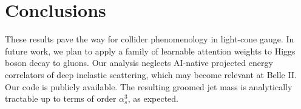 \section{Conclusions}\label{sec:conclusions}

These results pave the way for collider phenomenology in light-cone
gauge. In future work, we plan to apply a family of learnable attention
weights to Higgs boson decay to gluons. Our analysis neglects AI-native
projected energy correlators of deep inelastic scattering, which may
become relevant at Belle II. Our code is publicly available. The
resulting groomed jet mass is analytically tractable up to terms of
order $\alpha_s^3$, as expected.

